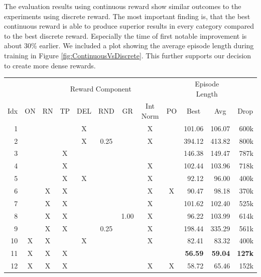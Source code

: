 The evaluation results using continuous reward show similar outcomes to the experiments using discrete reward. The most important finding is, that the best continuous reward is able to produce superior results in every category compared to the best discrete reward. Especially the time of first notable improvement is about 30\% earlier. We included a plot showing the average episode length during training in Figure \ref{fig:ContinuousVsDiscrete}. This further supports our decision to create more dense rewards. 

\begin{table}[htp]
    \begin{center}
        \begin{tabular}{rccccccccrrr}
            \toprule
             & \multicolumn{8}{c}{Reward Component} & \multicolumn{2}{c}{Episode Length} & \\
            \cmidrule(lr){2-9}\cmidrule(lr){10-11}
            \multicolumn{1}{c}{Idx} & \multicolumn{1}{c}{ON} & \multicolumn{1}{c}{RN} & \multicolumn{1}{c}{TP} & \multicolumn{1}{c}{DEL} & \multicolumn{1}{c}{RND} & \multicolumn{1}{c}{GR} & \multicolumn{1}{c}{Int Norm} & \multicolumn{1}{c}{PO} & \multicolumn{1}{c}{Best} & \multicolumn{1}{c}{Avg} & \multicolumn{1}{c}{Drop}\\
            \midrule
            1 &  &  &  & X &  &  & X &  & 101.06 & 106.07 & 600k \\
            2 &  &  &  & X & 0.25 &  & X &  & 394.12 & 413.82 & 800k \\
            3 &  &  & X &  &  &  &  &  & 146.38 & 149.47 & 787k \\
            4 &  &  & X &  &  &  & X &  & 102.44 & 103.96 & 718k \\
            5 &  &  & X & X &  &  & X &  & 92.12 & 96.00 & 400k \\
            6 &  & X & X &  &  &  & X & X & 90.47 & 98.18 & 370k \\
            7 &  & X & X &  &  &  & X &  & 101.62 & 102.40 & 525k \\
            8 &  & X & X &  &  & 1.00 & X &  & 96.22 & 103.99 & 614k \\
            9 &  & X & X &  & 0.25 &  & X &  & 198.44 & 335.29 & 561k \\
            10 & X & X &  & X &  &  & X &  & 82.41 & 83.32 & 400k \\
            11 & X & X & X &  &  &  &  &  & \textbf{56.59} & \textbf{59.04} & \textbf{127k} \\
            12 & X & X & X &  &  &  & X & X & 58.72 & 65.46 & 152k \\

\end{tabular}
\end{center}
\end{table}
